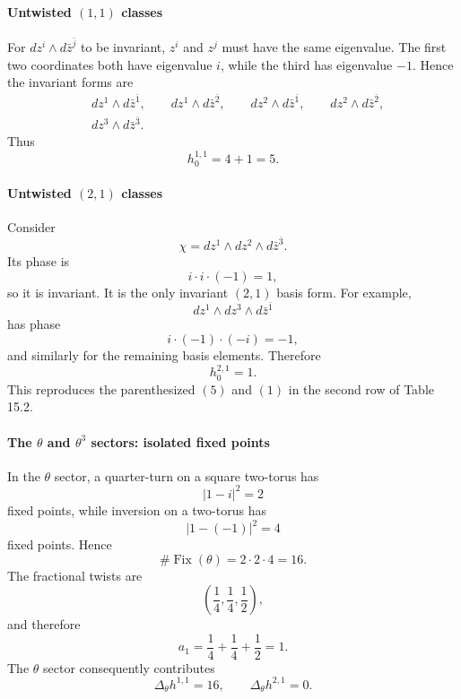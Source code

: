 \documentclass[
  10pt,
  a4paper,
  openany]{book}
\begin{document}
\paragraph{\texorpdfstring{Untwisted \((1,1)\)
classes}{Untwisted (1,1) classes}}\label{untwisted-11-classes-1}

For \(dz^i\wedge d\bar z^{\bar j}\) to be invariant, \(z^i\) and \(z^j\)
must have the same eigenvalue. The first two coordinates both have
eigenvalue \(i\), while the third has eigenvalue \(-1\). Hence the
invariant forms are \[
\begin{aligned}
&dz^1\wedge d\bar z^{\bar1},
\qquad
dz^1\wedge d\bar z^{\bar2},
\qquad
dz^2\wedge d\bar z^{\bar1},
\qquad
dz^2\wedge d\bar z^{\bar2},\\
&dz^3\wedge d\bar z^{\bar3}.
\end{aligned}
\] Thus \[
\boxed{h_0^{1,1}=4+1=5}.
\]

\paragraph{\texorpdfstring{Untwisted \((2,1)\)
classes}{Untwisted (2,1) classes}}\label{untwisted-21-classes-1}

Consider \[
\chi
=
dz^1\wedge dz^2\wedge d\bar z^{\bar3}.
\] Its phase is \[
i\cdot i\cdot(-1)=1,
\] so it is invariant. It is the only invariant \((2,1)\) basis form.
For example, \[
dz^1\wedge dz^3\wedge d\bar z^{\bar1}
\] has phase \[
i\cdot(-1)\cdot(-i)=-1,
\] and similarly for the remaining basis elements. Therefore \[
\boxed{h_0^{2,1}=1}.
\] This reproduces the parenthesized \((5)\) and \((1)\) in the second
row of Table 15.2.

\paragraph{\texorpdfstring{The \(\theta\) and \(\theta^3\) sectors:
isolated fixed
points}{The \textbackslash theta and \textbackslash theta\^{}3 sectors: isolated fixed points}}\label{the-theta-and-theta3-sectors-isolated-fixed-points}

In the \(\theta\) sector, a quarter-turn on a square two-torus has \[
\left|1-i\right|^2=2
\] fixed points, while inversion on a two-torus has \[
\left|1-(-1)\right|^2=4
\] fixed points. Hence \[
\#\operatorname{Fix}(\theta)
=2\cdot2\cdot4
=16.
\] The fractional twists are \[
\left(\frac14,\frac14,\frac12\right),
\] and therefore \[
a_1=\frac14+\frac14+\frac12=1.
\] The \(\theta\) sector consequently contributes \[
\boxed{
\Delta_{\theta}h^{1,1}=16,
\qquad
\Delta_{\theta}h^{2,1}=0
}.
\]
\end{document}
